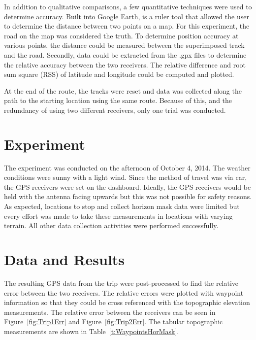 \documentclass[]{aiaa-tc}%
\begin{document}
	\vspace{5 mm}
	
	\noindent In addition to qualitative comparisons, a few quantitative techniques were used to determine accuracy. Built into Google Earth, is a ruler tool that allowed the user to determine the distance between two points on a map. For this experiment, the road on the map was considered the truth. To determine position accuracy at various points, the distance could be measured between the superimposed track and the road. Secondly, data could be extracted from the .gpx files to determine the relative accuracy between the two receivers. The relative difference and root sum square (RSS) of latitude and longitude could be computed and plotted. 
	
	\vspace{5 mm}
	
	\noindent At the end of the route, the tracks were reset and data was collected along the path to the starting location using the same route. Because of this, and the redundancy of using two different receivers, only one trial was conducted. 
	
	\section{Experiment}
	
	\vspace{5 mm}
	
	\noindent The experiment was conducted on the afternoon of October 4, 2014. The weather conditions were sunny with a light wind. Since the method of travel was via car, the GPS receivers were set on the dashboard. Ideally, the GPS receivers would be held with the antenna facing upwards but this was not possible for safety reasons. As expected, locations to stop and collect horizon mask data were limited but every effort was made to take these measurements in locations with varying terrain. All other data collection activities were performed successfully.
	
	\section{Data and Results}
	
	\noindent The resulting GPS data from the trip were post-processed to find the relative error between the two receivers. The relative errors were plotted with waypoint information so that they could be cross referenced with the topographic elevation measurements. The relative error between the receivers can be seen in Figure~\ref{fig:Trip1Err} and Figure~\ref{fig:Trip2Err}. The tabular topographic measurements are shown in Table~\ref{t:WaypointsHorMask}. 
	
\end{document}
